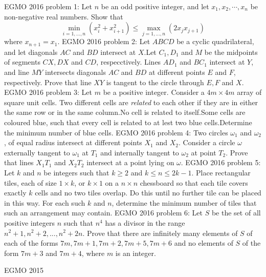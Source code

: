 EGMO 2016 problem 1:  Let $n$ be an odd positive integer, and let $x_1,x_2,\cdots ,x_n$ be non-negative real numbers. Show that
\[ \min_{i=1,\ldots,n} (x_i^2+x_{i+1}^2) \leq \max_{j=1,\ldots,n} (2x_jx_{j+1}) \]
where $x_{n+1}=x_1$. 
EGMO 2016 problem 2:  Let $ABCD$ be a cyclic quadrilateral, and let diagonals $AC$ and $BD$ intersect at $X$.Let $C_1,D_1$ and $M$ be the midpoints of segments $CX,DX$ and $CD$, respecctively. Lines $AD_1$ and $BC_1$ intersect at $Y$, and line $MY$ intersects diagonals $AC$ and $BD$ at different points $E$ and $F$, respectively. Prove that line $XY$ is tangent to the circle through $E,F$ and $X$. 
EGMO 2016 problem 3:  Let $m$ be a positive integer. Consider a $4m\times 4m$ array of square unit cells. Two different cells are \textit{related} to each other if they are in either the same row or in the same column.No cell is related to itself.Some cells are coloured blue, such that every cell is related to at lest two blue cells.Determine the minimum number of blue cells. 
EGMO 2016 problem 4:  Two circles $\omega_1$ and $\omega_2$, of equal radius intersect at different points $X_1$ and $X_2$. Consider a circle $\omega$ externally tangent to $\omega_1$ at $T_1$ and internally tangent to $\omega_2$ at point $T_2$. Prove that lines $X_1T_1$ and $X_2T_2$ intersect at a point lying on $\omega$. 
EGMO 2016 problem 5:  Let $k$ and $n$ be integers such that $k\ge 2$ and $k \le n \le 2k-1$. Place rectangular tiles, each of size $1 \times k$, or $k \times 1$ on a $n \times n$ chessboard so that each tile covers exactly $k$ cells and no two tiles overlap. Do this until no further tile can be placed in this way. For each such $k$ and $n$, determine the minimum number of tiles that such an arrangement may contain. 
EGMO 2016 problem 6:  Let $S$ be the set of all positive integers $n$ such that $n^4$ has a divisor in the range $n^2 +1, n^2 + 2,...,n^2 + 2n$. Prove that there are infinitely many elements of $S$ of each of the forms $7m, 7m+1, 7m+2, 7m+5, 7m+6$ and no elements of $S$ of the form $7m+3$ and $7m+4$, where $m$ is an integer. 

EGMO 2015 

